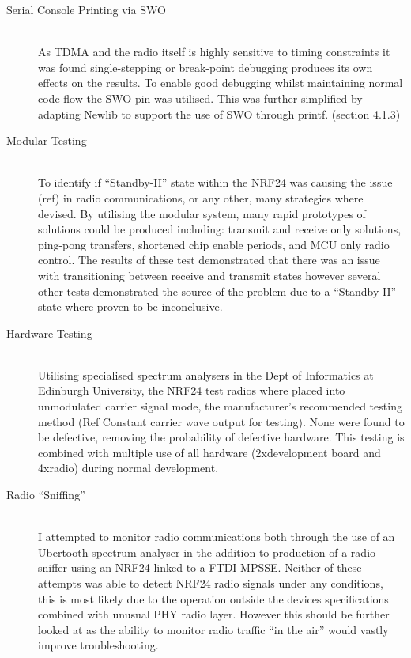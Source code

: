 \begin{description}
  \item[Serial Console Printing via \ac{SWO}] \hfill \\
    As \ac{TDMA} and the radio itself is highly sensitive to timing constraints
    it was found single-stepping or break-point debugging produces its own effects
    on the results. To enable good debugging whilst maintaining normal code flow
    the \ac{SWO} pin was utilised. This was further simplified by adapting Newlib
    to support the use of \ac{SWO} through printf. (section {4.1.3})
  
  \item[Modular Testing] \hfill \\
    To identify if ``Standby-II'' state within the \ac{NRF24} was causing the issue
    (ref) in radio communications, or any other, many strategies where devised.
    By utilising the modular system, many rapid prototypes of solutions could be
    produced including: transmit and receive only solutions, ping-pong transfers,
    shortened chip enable periods, and \ac{MCU} only radio control. The results
    of these test demonstrated that there was an issue with transitioning between
    receive and transmit states however several other tests demonstrated the source
    of the problem due to a ``Standby-II'' state where proven to be inconclusive.
  
  \item[Hardware Testing] \hfill \\
    Utilising specialised spectrum analysers in the Dept of Informatics at
    Edinburgh University, the \ac{NRF24} test radios where placed into unmodulated
    carrier signal mode, the manufacturer's recommended testing method
    (Ref Constant carrier wave output for testing). None were found to be defective,
    removing the probability of defective hardware. This testing is combined with
    multiple use of all hardware (2xdevelopment board and 4xradio) during normal
    development.
  
  \item[Radio ``Sniffing''] \hfill \\
    I attempted to monitor radio communications both through the use of an
    Ubertooth spectrum analyser  in the addition to production of a radio sniffer
    using an \ac{NRF24} linked to a FTDI \ac{MPSSE}. Neither of these attempts 
    was able to detect \ac{NRF24} radio signals under any conditions, this is most
    likely due to the operation outside the devices specifications combined with
    unusual \ac{PHY} radio layer. However this should be further looked at as the
    ability to monitor radio traffic ``in the air'' would vastly improve troubleshooting.
\end{description}

